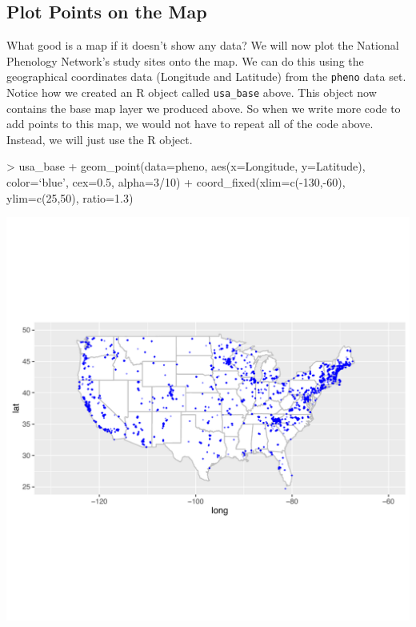 \documentclass[11pt,twosided]{article}
\begin{document}
\newpage
\subsection{Plot Points on the Map}
What good is a map if it doesn't show any data?  We will now plot the National Phenology Network's study sites onto the map.  We can do this using the geographical coordinates data (Longitude and Latitude) from the {\tt pheno} data set.  Notice how we created an R object called {\tt usa\_base} above.  This object now contains the base map layer we produced above.  So when we write more code to add points to this map, we would not have to repeat all of the code above.  Instead, we will just use the R object.\\


\begin{tcolorbox}[breakable,boxrule=0.5pt,enhanced]
\begin{code}

> usa_base + geom_point(data=pheno, aes(x=Longitude, y=Latitude), 
	color=`blue', cex=0.5, alpha=3/10) + 
	coord_fixed(xlim=c(-130,-60), ylim=c(25,50), ratio=1.3)
\end{code}
\end{tcolorbox}
\vspace{2ex}

\begin{center}
\includegraphics[width=6.5in]{usa_base_points}
\end{center}
\end{document}
